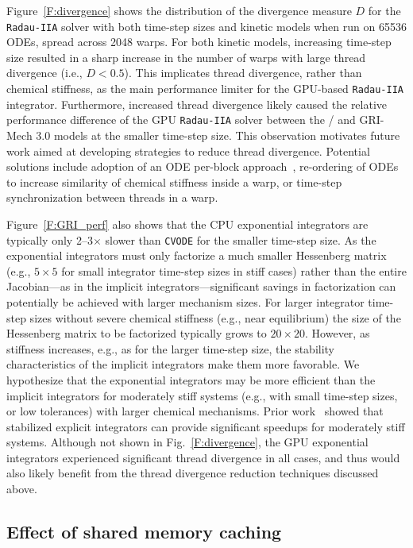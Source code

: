 \documentclass[preprint]{elsarticle}
\begin{document}
Figure~\ref{F:divergence} shows the distribution of the divergence measure $D$ for the \texttt{Radau-IIA} solver with both time-step sizes and kinetic models when run on \num{65536} ODEs, spread across \num{2048} warps.
For both kinetic models, increasing time-step size resulted in a sharp increase in the number of warps with large thread divergence (i.e., $D < 0.5$).
This implicates thread divergence, rather than chemical stiffness, as the main performance limiter for the GPU-based \texttt{Radau-IIA} integrator.
Furthermore, increased thread divergence likely caused the relative performance difference of the GPU \texttt{Radau-IIA} solver between the \slash{} and GRI-Mech 3.0 models at the smaller time-step size.
This observation motivates future work aimed at developing strategies to reduce thread divergence.
Potential solutions include adoption of an ODE per-block approach~\cite{Stone:2013aa}, re-ordering of ODEs to increase similarity of chemical stiffness inside a warp, or time-step synchronization between threads in a warp.

Figure~\ref{F:GRI_perf} also shows that the CPU exponential integrators are typically only \numrange{2}{3}$\times$ slower than \texttt{CVODE} for the smaller time-step size.
As the exponential integrators must only factorize a much smaller Hessenberg matrix (e.g., $5 \times 5$ for small integrator time-step sizes in stiff cases) rather than the entire Jacobian---as in the implicit integrators---significant savings in factorization can potentially be achieved with larger mechanism sizes.
For larger integrator time-step sizes without severe chemical stiffness (e.g., near equilibrium) the size of the Hessenberg matrix to be factorized typically grows to $20\times 20$.
However, as stiffness increases, e.g., as for the larger time-step size, the stability characteristics of the implicit integrators make them more favorable.
We hypothesize that the exponential integrators may be more efficient than the implicit integrators for moderately stiff systems (e.g., with small time-step sizes, or low tolerances) with larger chemical mechanisms.
Prior work~\cite{Niemeyer:2014aa} showed that stabilized explicit integrators can provide significant speedups for moderately stiff systems.
Although not shown in Fig.~\ref{F:divergence}, the GPU exponential integrators experienced significant thread divergence in all cases, and thus would also likely benefit from the thread divergence reduction techniques discussed above.

\subsection{Effect of shared memory caching}
\label{S:smem}
\end{document}
